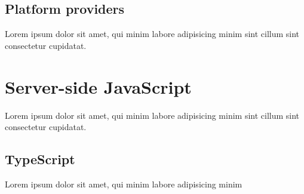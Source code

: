 \subsection{Platform providers}

Lorem ipsum dolor sit amet, qui minim labore adipisicing minim sint cillum sint consectetur cupidatat.

\section{Server-side JavaScript}

Lorem ipsum dolor sit amet, qui minim labore adipisicing minim sint cillum sint consectetur cupidatat.

\subsection{TypeScript}

Lorem ipsum dolor sit amet, qui minim labore adipisicing minim
